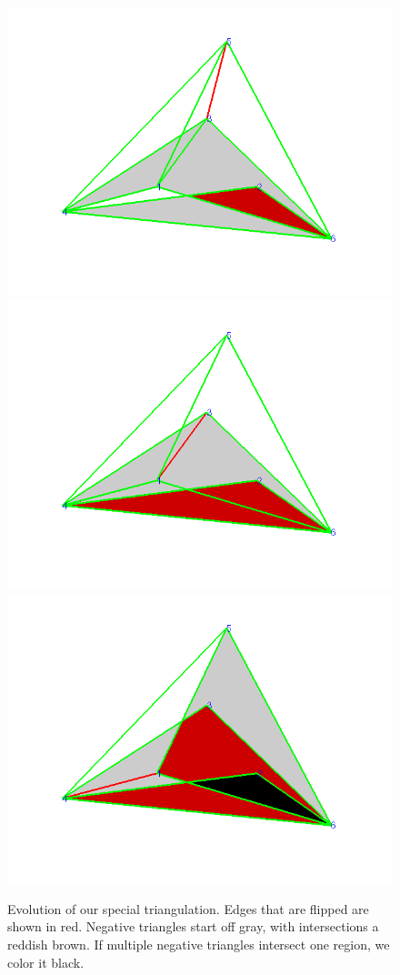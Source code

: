 \documentclass[12pt]{article}
\begin{document}
\begin{figure}
\includegraphics[scale = .45]{Pictures/triExD3.png}
\includegraphics[scale = .45]{Pictures/triExD4.png}
\includegraphics[scale = .45]{Pictures/triExD5.png}
\caption{Evolution of our special triangulation. Edges that are flipped are shown in red. Negative triangles start off gray, with intersections a reddish brown. If multiple negative triangles intersect one region, we color it black.}
\label{specialCase}
\end{figure}
\end{document}
